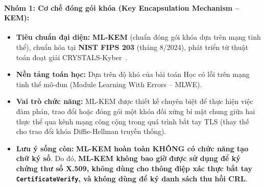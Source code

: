 \paragraph{Nhóm 1: Cơ chế đóng gói khóa (Key Encapsulation Mechanism -- KEM):}
\begin{itemize}
    \item \textbf{Tiêu chuẩn đại diện:} \textbf{ML-KEM} (chuẩn đóng gói khóa dựa trên mạng tinh thể), chuẩn hóa tại \textbf{NIST FIPS 203} (tháng 8/2024), phát triển từ thuật toán đoạt giải CRYSTALS-Kyber~\cite{fips203}.
    \item \textbf{Nền tảng toán học:} Dựa trên độ khó của bài toán Học có lỗi trên mạng tinh thể mô-đun (Module Learning With Errors -- MLWE).
    \item \textbf{Vai trò chức năng:} ML-KEM được thiết kế chuyên biệt để thực hiện việc đàm phán, trao đổi hoặc đóng gói một khóa đối xứng bí mật chung giữa hai thực thể qua kênh mạng công cộng trong quá trình bắt tay TLS (thay thế cho trao đổi khóa Diffie-Hellman truyền thống).
    \item \textbf{Lưu ý sống còn:} \textbf{ML-KEM hoàn toàn KHÔNG có chức năng tạo chữ ký số}. Do đó, \textbf{ML-KEM không bao giờ được sử dụng để ký chứng thư số X.509, không dùng cho thông điệp xác thực bắt tay \texttt{CertificateVerify}, và không dùng để ký danh sách thu hồi CRL}.
\end{itemize}

